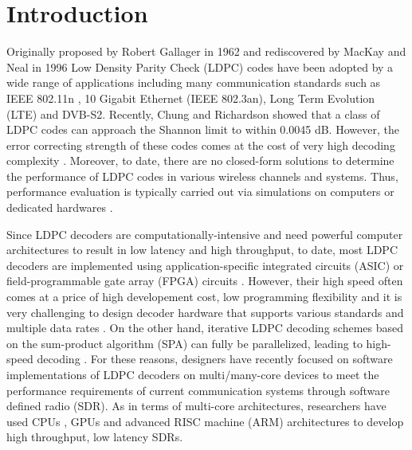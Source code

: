 \documentclass[conference]{IEEEtran}
\begin{document}
\IEEEpeerreviewmaketitle

\section{Introduction}
Originally proposed by Robert Gallager in 1962 \cite{art_gallager} and rediscovered by MacKay and Neal in 1996 \cite{art_macKay} Low Density Parity Check (LDPC) codes have been adopted by a wide range of applications including many communication standards such as IEEE 802.11n , 10 Gigabit Ethernet (IEEE 802.3an), Long Term Evolution (LTE) and DVB-S2. Recently, Chung and Richardson \cite{art_shannon} showed that a class of LDPC codes can approach the Shannon limit to within 0.0045 dB. However, the error correcting strength of these codes comes at the cost of very high decoding complexity \cite{art_ldpc_cpu1}. Moreover, to date, there are no closed-form solutions to determine the performance of LDPC codes in various wireless channels and systems. Thus, performance evaluation is typically carried out via simulations on computers or dedicated hardwares \cite{art_memory_coalesced}.

Since LDPC decoders are computationally-intensive and need powerful computer architectures to result in low latency and high throughput, to date, most LDPC decoders are implemented using application-specific integrated circuits (ASIC) or field-programmable gate array (FPGA) circuits \cite{art_ldpc_OpenCl_1}. However, their high speed often comes at a price of high developement cost, low programming flexibility \cite{art_convolutional} and it is very challenging to design decoder hardware that supports various standards and multiple data rates \cite{art_cuda_openmp}. On the other hand, iterative LDPC decoding schemes based on the sum-product algorithm (SPA) can fully be parallelized, leading to high-speed decoding \cite{art_shannon}. For these reasons, designers have recently focused on software implementations of LDPC decoders on multi/many-core devices \cite{art_massively} to meet the performance requirements of current communication systems through software defined radio (SDR). As in terms of multi-core architectures, researchers have used CPUs \cite{art_cpu_gpu, art_ldpc_cpu0}, GPUs \cite{art_memory_coalesced, art_massively, art_optimize_0} and advanced RISC machine (ARM) \cite{art_ldpc_cpu0, art_neon} architectures to develop high throughput, low latency SDRs. 
\end{document}
